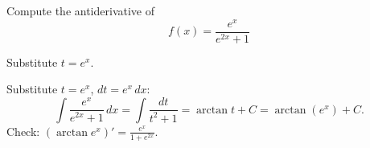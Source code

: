 
\begin{question}
Compute the antiderivative of
\[ f(x)=\frac{e^x}{e^{2x}+1} \]
\end{question}

\begin{hint}
Substitute $t=e^x$.
\end{hint}

\begin{solution}
Substitute $t=e^x$, $dt=e^x\,dx$:
\[ \int\frac{e^x}{e^{2x}+1}\,dx=\int\frac{dt}{t^2+1}=\arctan t+C=\boxed{\arctan(e^x)+C}. \]
Check: $\left(\arctan e^x\right)'=\frac{e^x}{1+e^{2x}}$.
\end{solution}
